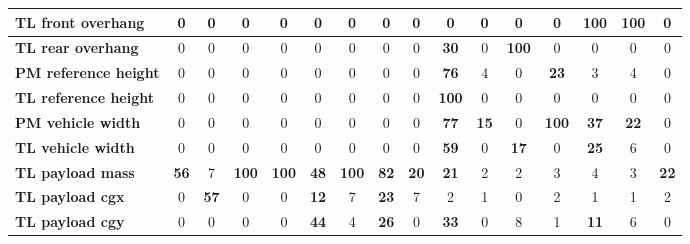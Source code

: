 \begin{table}[H]
\begin{tabular}{|l|c|c|c|c|c|c|c|c|c|c|c|c|c|c|c|}
\hline
\textcolor[rgb]{0.851, 0.373, 0.008}{\textbf{TL front overhang}} & 0 & 0 & 0 & 0 & 0 & 0 & 0 & 0 & 0 & 0 & 0 & 0 & \textcolor[rgb]{0.835, 0.369, 0.000}{\textbf{100}} & \textcolor[rgb]{0.835, 0.369, 0.000}{\textbf{100}} & 0 \\
\hline
\textcolor[rgb]{0.851, 0.373, 0.008}{\textbf{TL rear overhang}} & 0 & 0 & 0 & 0 & 0 & 0 & 0 & 0 & \textcolor[rgb]{0.000, 0.620, 0.451}{\textbf{30}} & 0 & \textcolor[rgb]{0.835, 0.369, 0.000}{\textbf{100}} & 0 & 0 & 0 & 0 \\
\hline
\textcolor[rgb]{0.000, 0.447, 0.698}{\textbf{PM reference height}} & 0 & 0 & 0 & 0 & 0 & 0 & 0 & 0 & \textcolor[rgb]{0.000, 0.447, 0.698}{\textbf{76}} & 4 & 0 & \textbf{23} & 3 & 4 & 0 \\
\hline
\textcolor[rgb]{0.851, 0.373, 0.008}{\textbf{TL reference height}} & 0 & 0 & 0 & 0 & 0 & 0 & 0 & 0 & \textcolor[rgb]{0.835, 0.369, 0.000}{\textbf{100}} & 0 & 0 & 0 & 0 & 0 & 0 \\
\hline
\textcolor[rgb]{0.851, 0.373, 0.008}{\textbf{PM vehicle width}} & 0 & 0 & 0 & 0 & 0 & 0 & 0 & 0 & \textcolor[rgb]{0.000, 0.447, 0.698}{\textbf{77}} & \textbf{15} & 0 & \textcolor[rgb]{0.835, 0.369, 0.000}{\textbf{100}} & \textcolor[rgb]{0.000, 0.620, 0.451}{\textbf{37}} & \textbf{22} & 0 \\
\hline
\textcolor[rgb]{0.000, 0.447, 0.698}{\textbf{TL vehicle width}} & 0 & 0 & 0 & 0 & 0 & 0 & 0 & 0 & \textcolor[rgb]{0.000, 0.447, 0.698}{\textbf{59}} & 0 & \textbf{17} & 0 & \textcolor[rgb]{0.000, 0.620, 0.451}{\textbf{25}} & 6 & 0 \\
\hline
\textcolor[rgb]{0.851, 0.373, 0.008}{\textbf{TL payload mass}} & \textcolor[rgb]{0.000, 0.447, 0.698}{\textbf{56}} & 7 & \textcolor[rgb]{0.835, 0.369, 0.000}{\textbf{100}} & \textcolor[rgb]{0.835, 0.369, 0.000}{\textbf{100}} & \textcolor[rgb]{0.000, 0.620, 0.451}{\textbf{48}} & \textcolor[rgb]{0.835, 0.369, 0.000}{\textbf{100}} & \textcolor[rgb]{0.000, 0.447, 0.698}{\textbf{82}} & \textbf{20} & \textbf{21} & 2 & 2 & 3 & 4 & 3 & \textbf{22} \\
\hline
\textcolor[rgb]{0.000, 0.447, 0.698}{\textbf{TL payload \gls{cgx}}} & 0 & \textcolor[rgb]{0.000, 0.447, 0.698}{\textbf{57}} & 0 & 0 & \textbf{12} & 7 & \textbf{23} & 7 & 2 & 1 & 0 & 2 & 1 & 1 & 2 \\
\hline
\textcolor[rgb]{0.000, 0.620, 0.451}{\textbf{TL payload \gls{cgy}}} & 0 & 0 & 0 & 0 & \textcolor[rgb]{0.000, 0.620, 0.451}{\textbf{44}} & 4 & \textcolor[rgb]{0.000, 0.620, 0.451}{\textbf{26}} & 0 & \textcolor[rgb]{0.000, 0.620, 0.451}{\textbf{33}} & 0 & 8 & 1 & \textbf{11} & 6 & 0 \\

\end{tabular}
\end{table}
